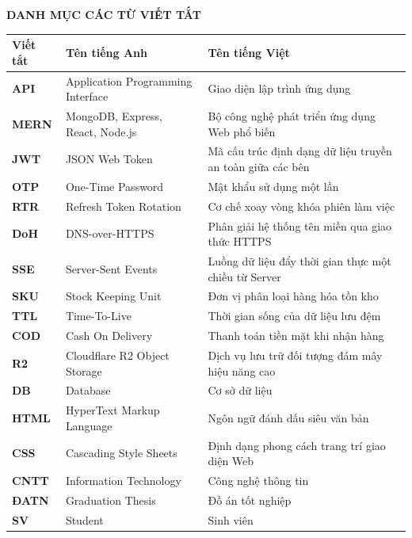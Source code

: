 \documentclass[../DoAn.tex]{subfiles}
\begin{document}
\begin{center}
    \Large{\textbf{DANH MỤC CÁC TỪ VIẾT TẮT}}\\
\end{center}
\vspace{1cm}

\begin{longtable}{l >{\raggedright\arraybackslash}p{5.5cm} >{\raggedright\arraybackslash}p{6.5cm}}
	\hline
   \textbf{Viết tắt}  & \textbf{Tên tiếng Anh}	& \textbf{Tên tiếng Việt} \\ \hline 
	\textbf{API} & Application Programming Interface & Giao diện lập trình ứng dụng\\
	\textbf{MERN} & MongoDB, Express, React, Node.js & Bộ công nghệ phát triển ứng dụng Web phổ biến\\
	\textbf{JWT} & JSON Web Token & Mã cấu trúc định dạng dữ liệu truyền an toàn giữa các bên\\
	\textbf{OTP} & One-Time Password & Mật khẩu sử dụng một lần\\
	\textbf{RTR} & Refresh Token Rotation & Cơ chế xoay vòng khóa phiên làm việc\\
	\textbf{DoH} & DNS-over-HTTPS & Phân giải hệ thống tên miền qua giao thức HTTPS\\
	\textbf{SSE} & Server-Sent Events & Luồng dữ liệu đẩy thời gian thực một chiều từ Server\\
	\textbf{SKU} & Stock Keeping Unit & Đơn vị phân loại hàng hóa tồn kho\\
	\textbf{TTL} & Time-To-Live & Thời gian sống của dữ liệu lưu đệm\\
	\textbf{COD} & Cash On Delivery & Thanh toán tiền mặt khi nhận hàng\\
	\textbf{R2} & Cloudflare R2 Object Storage & Dịch vụ lưu trữ đối tượng đám mây hiệu năng cao\\
	\textbf{DB} & Database & Cơ sở dữ liệu\\
	\textbf{HTML} & HyperText Markup Language & Ngôn ngữ đánh dấu siêu văn bản\\
	\textbf{CSS} & Cascading Style Sheets & Định dạng phong cách trang trí giao diện Web\\
	\textbf{CNTT} & Information Technology & Công nghệ thông tin\\
	\textbf{ĐATN} & Graduation Thesis & Đồ án tốt nghiệp \\
	\textbf{SV} & Student & Sinh viên \\
    \hline
\end{longtable}
\end{document}
